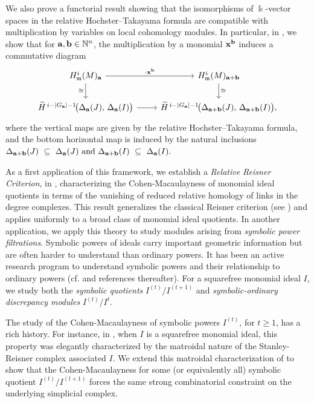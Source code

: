 \documentclass[12pt]{amsart}
\numberwithin{equation}{section}
\theoremstyle{definition}
\theoremstyle{definition}
\newcommand{\NN}{{\mathbb N}}
\def\kk{{\Bbbk}}
\def\a{{\bold a}}
\def\b{{\bold b}}
\def\x{{\bold x}}
\begin{document}
\medskip

We also prove a functorial result showing that the isomorphisms of $\kk$-vector spaces in the relative Hochster--Takayama formula are compatible with multiplication by variables on local cohomology modules. In particular, in , we show that 	for $\a, \b \in \NN^n$, the multiplication by a monomial $\x^\b$ induces a commutative diagram
\[
\begin{tikzcd}
	H^i_{\mathfrak m}(M)_\a
	\arrow[r,"{\cdot \x^\b}"]
	\arrow[d,"\cong"']
	&
	H^i_{\mathfrak m}(M)_{\a+\b}
	\arrow[d,"\cong"]
	\\
	\widetilde H^{\,i-|G_\a|-1}\!
	\big(
	\Delta_\a(J),\,\Delta_\a(I)
	\big)
	\arrow[r]
	&
	\widetilde H^{\,i-|G_\a|-1}\!
	\big(
	\Delta_{\a+\b}(J),\,\Delta_{\a+\b}(I)
	\big),
\end{tikzcd}
\]
where the vertical maps are given by the relative Hochster--Takayama
formula, and the bottom horizontal map is induced by the natural inclusions $\Delta_{\a+\b}(J)\ \subseteq\ \Delta_\a(J) \text{ and }
\Delta_{\a+\b}(I)\ \subseteq\ \Delta_\a(I).$

As a first application of this framework, we establish a \emph{Relative Reisner Criterion}, in , characterizing the Cohen-Macaulayness of monomial ideal quotients in terms of the vanishing of reduced relative homology of links in the degree complexes. This result generalizes the classical Reisner criterion (see \cite{Reisner}) and applies uniformly to a broad class of monomial ideal quotients.
In another application, we apply this theory to study modules arising from \emph{symbolic power filtrations}. Symbolic powers of ideals carry important geometric information but are often harder to understand than ordinary powers. It has been an active research program to understand symbolic powers and their relationship to ordinary powers (cf. \cite{ELS, HHT2007, HH} and references thereafter). For a squarefree monomial ideal $I$, we study both the \emph{symbolic quotients} $I^{(t)}/I^{(t+1)}$ and 
\emph{symbolic-ordinary discrepancy modules} $I^{(t)}/I^t$.

The study of the Cohen-Macaulayness of symbolic powers $I^{(t)}$, for $t \ge 1$, has a rich history. For instance, in \cite{MT2011, V2011}, when $I$ is a squarefree monomial ideal, this property was elegantly characterized by the matroidal nature of the Stanley-Reisner complex associated $I$. We extend this matroidal characterization of  \cite{MT2011, V2011} to show that the Cohen-Macaulayness for some (or equivalently all) symbolic quotient $I^{(t)}/I^{(t+1)}$ forces the same strong combinatorial constraint on the underlying simplicial complex. 
	
\end{document}

